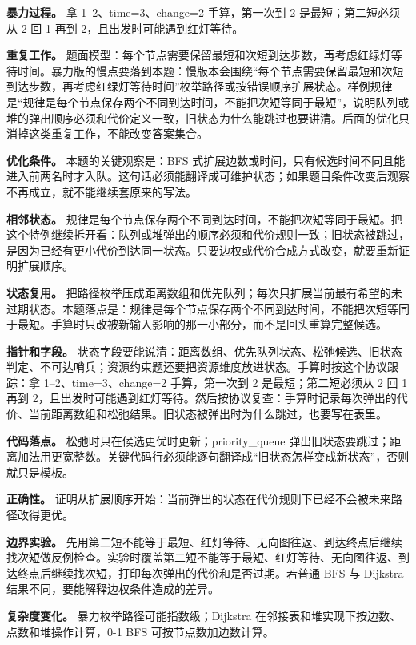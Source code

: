 \textbf{暴力过程。} 拿 1--2、time=3、change=2 手算，第一次到 2 是最短；第二短必须从 2 回 1 再到 2，且出发时可能遇到红灯等待。

\textbf{重复工作。} 题面模型：每个节点需要保留最短和次短到达步数，再考虑红绿灯等待时间。暴力版的慢点要落到本题：慢版本会围绕“每个节点需要保留最短和次短到达步数，再考虑红绿灯等待时间”枚举路径或按错误顺序扩展状态。样例规律是“规律是每个节点保存两个不同到达时间，不能把次短等同于最短”，说明队列或堆的弹出顺序必须和代价定义一致，旧状态为什么能跳过也要讲清。后面的优化只消掉这类重复工作，不能改变答案集合。

\textbf{优化条件。} 本题的关键观察是：BFS 式扩展边数或时间，只有候选时间不同且能进入前两名时才入队。这句话必须能翻译成可维护状态；如果题目条件改变后观察不再成立，就不能继续套原来的写法。

\textbf{相邻状态。} 规律是每个节点保存两个不同到达时间，不能把次短等同于最短。把这个特例继续拆开看：队列或堆弹出的顺序必须和代价规则一致；旧状态被跳过，是因为已经有更小代价到达同一状态。只要边权或代价合成方式改变，就要重新证明扩展顺序。

\textbf{状态复用。} 把路径枚举压成距离数组和优先队列；每次只扩展当前最有希望的未过期状态。本题落点是：规律是每个节点保存两个不同到达时间，不能把次短等同于最短。手算时只改被新输入影响的那一小部分，而不是回头重算完整候选。

\textbf{指针和字段。} 状态字段要能说清：距离数组、优先队列状态、松弛候选、旧状态判定、不可达哨兵；资源约束题还要把资源维度放进状态。手算时按这个协议跟踪：拿 1--2、time=3、change=2 手算，第一次到 2 是最短；第二短必须从 2 回 1 再到 2，且出发时可能遇到红灯等待。然后按协议复查：手算时记录每次弹出的代价、当前距离数组和松弛结果。旧状态被弹出时为什么跳过，也要写在表里。

\textbf{代码落点。} 松弛时只在候选更优时更新；priority\_queue 弹出旧状态要跳过；距离加法用更宽整数。关键代码行必须能逐句翻译成“旧状态怎样变成新状态”，否则就只是模板。

\textbf{正确性。} 证明从扩展顺序开始：当前弹出的状态在代价规则下已经不会被未来路径改得更优。

\textbf{边界实验。} 先用第二短不能等于最短、红灯等待、无向图往返、到达终点后继续找次短做反例检查。实验时覆盖第二短不能等于最短、红灯等待、无向图往返、到达终点后继续找次短，打印每次弹出的代价和是否过期。若普通 BFS 与 Dijkstra 结果不同，要能解释边权条件造成的差异。

\textbf{复杂度变化。} 暴力枚举路径可能指数级；Dijkstra 在邻接表和堆实现下按边数、点数和堆操作计算，0-1 BFS 可按节点数加边数计算。

